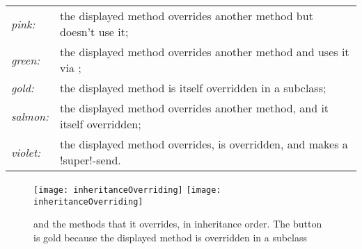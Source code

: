 \documentclass[a4paper,10pt,twoside]{book}
\begin{document}


\begin{tabular}{lp{9cm}}
	\emph{pink:} & the displayed method overrides another method but doesn't use it;\\
	\emph{green:} & the displayed method overrides another method and uses it via \super;\\
	\emph{gold:} & the displayed method is itself overridden in a subclass;\\
	\emph{salmon:} & the displayed method overrides another method, and it itself overridden;\\
	\emph{violet:} & the displayed method overrides, is overridden, and makes a \ct!super!-send.
\end{tabular}

\begin{figure}[tbp]
	\begin{center}
   \ifluluelse
		{\texttt{[image: inheritanceOverriding]}}
		{\texttt{[image: inheritanceOverriding]}}
	\end{center}
	\caption{ and the methods that it overrides, in inheritance order. 
	The  button is gold because the displayed method is overridden in a subclass}
	\label{fig:inheritanceOverriding}
\end{figure}
\end{document}
